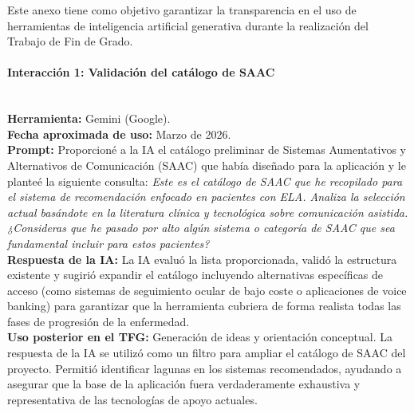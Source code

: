 
Este anexo tiene como objetivo garantizar la transparencia en el uso de herramientas de inteligencia artificial generativa durante la realización del Trabajo de Fin de Grado. 

\paragraph{Interacción 1: Validación del catálogo de SAAC} \mbox{} \\
\textbf{Herramienta:} Gemini (Google). \\
\textbf{Fecha aproximada de uso:} Marzo de 2026. \\
\textbf{Prompt:} Proporcioné a la IA el catálogo preliminar de Sistemas Aumentativos y Alternativos de Comunicación (SAAC) que había diseñado para la aplicación y le planteé la siguiente consulta: \textit{Este es el catálogo de SAAC que he recopilado para el sistema de recomendación enfocado en pacientes con ELA. Analiza la selección actual basándote en la literatura clínica y tecnológica sobre comunicación asistida. ¿Consideras que he pasado por alto algún sistema o categoría de SAAC que sea fundamental incluir para estos pacientes?} \\
\textbf{Respuesta de la IA:} La IA evaluó la lista proporcionada, validó la estructura existente y sugirió expandir el catálogo incluyendo alternativas específicas de acceso (como sistemas de seguimiento ocular de bajo coste o aplicaciones de voice banking) para garantizar que la herramienta cubriera de forma realista todas las fases de progresión de la enfermedad. \\
\textbf{Uso posterior en el TFG:} Generación de ideas y orientación conceptual. La respuesta de la IA se utilizó como un filtro para ampliar el catálogo de SAAC del proyecto. Permitió identificar lagunas en los sistemas recomendados, ayudando a asegurar que la base de la aplicación fuera verdaderamente exhaustiva y representativa de las tecnologías de apoyo actuales.


